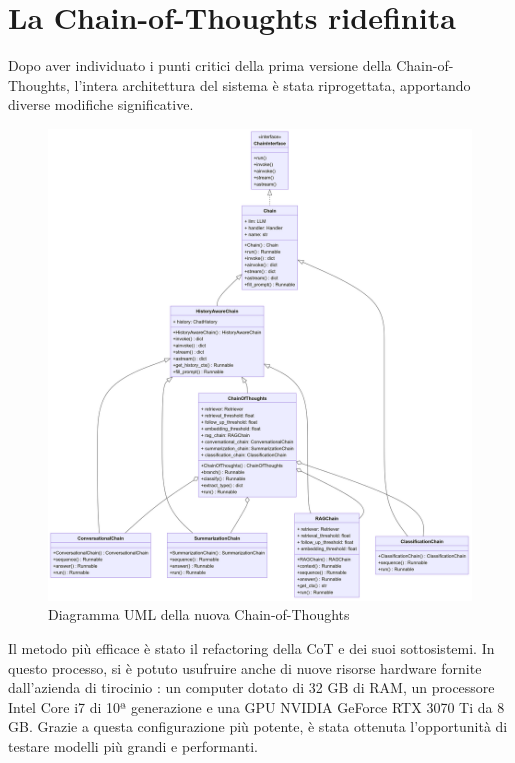 \section{La Chain-of-Thoughts ridefinita}
Dopo aver individuato i punti critici della prima versione della Chain-of-Thoughts, l'intera architettura del sistema è stata riprogettata, apportando diverse modifiche significative.
\begin{figure}[!t]
    \centering
    \includegraphics[width=\textwidth]{Images/cap4/schema2.png}
    \caption{Diagramma UML della nuova Chain-of-Thoughts}
    \label{fig:uml2}
\end{figure}
Il metodo più efficace è stato il refactoring della CoT e dei suoi sottosistemi. In questo processo, si è potuto usufruire anche di nuove risorse hardware fornite dall'azienda di tirocinio \cite{intellisync}: un computer dotato di 32 GB di RAM, un processore Intel Core i7 di 10ª generazione e una GPU NVIDIA GeForce RTX 3070 Ti da 8 GB. Grazie a questa configurazione più potente, è stata ottenuta l'opportunità di testare modelli più grandi e performanti.

